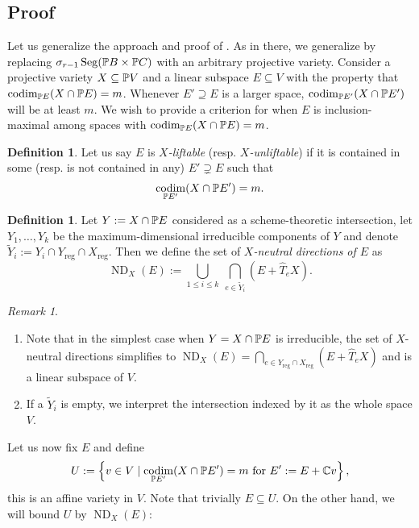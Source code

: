 \documentclass[a4paper,10pt]{article}
\def\reg{\text{reg}}
\def\set#1{\left\{#1\right\}}
\DeclareMathOperator{\codim}{codim}
\DeclareMathOperator{\ND}{ND}
\DeclareMathOperator{\Seg}{Seg}
\theoremstyle{definition}
\newtheorem{definition}[theorem]{Definition}
\theoremstyle{remark}
\newtheorem*{remark}{Remark}
\begin{document}
\subsection{Proof}

Let us generalize the approach and proof of \cite[Section 3]{draisma}. As in there, we generalize by replacing $\sigma_{r-1} \Seg(\pe B\times\pe C)$ with an arbitrary projective variety. Consider a projective variety $X\subseteq \pe V$ and a linear subspace $E\subseteq V$ with the property that $\codim_{\pe E}(X \cap \pe E) = m$. Whenever $E'\supseteq E$ is a larger space, $\codim_{\pe E'}(X\cap \pe E')$ will be at least $m$. We wish to provide a criterion for when $E$ is inclusion-maximal among spaces with $\codim_{\pe E}(X\cap \pe E)=m$.

\begin{definition}
    Let us say $E$ is \emph{$X$-liftable} (resp. \emph{$X$-unliftable}) if it is contained in some (resp. is not contained in any) $E'\supsetneq E$ such that
    \[
        \codim_{\pe E'} (X\cap \pe E') = m.
    \]
\end{definition}

\begin{definition}
    \label{def:NDX}
    Let $Y:=X\cap\pe E$ considered as a scheme-theoretic intersection, let $Y_1,\dots,Y_k$ be the maximum-dimensional irreducible components of $Y$ and denote $\tilde Y_i := Y_i\cap Y_\reg\cap X_\reg$.
    Then we define the set of \emph{$X$-neutral directions of $E$} as
    \[
        \ND_X(E) := \bigcup_{1\leq i\leq k}\ \bigcap_{e\in \tilde Y_i}(E+\hat T_{e}X).
    \]
\end{definition}
\begin{remark}
    \begin{enumerate}
    \item Note that in the simplest case when $Y=X\cap \pe E$ is irreducible, the set of $X$-neutral directions simplifies to
    $\ND_X(E) = \bigcap_{e\in Y_\reg\cap X_\reg} (E+\hat T_e X)$ and is a linear subspace of $V$.
    \item If a $\tilde Y_i$ is empty, we interpret the intersection indexed by it as the whole space $V$.
    \end{enumerate}
\end{remark}


Let us now fix $E$ and define
\[
    U := \set{v\in V\mid \text{$\codim_{\pe E'}(X\cap \pe E')=m$ for $E':= E+\ce v$}},
\]
this is an affine variety in $V$. Note that trivially $E\subseteq U$. On the other hand, we will bound $U$ by $\ND_X(E)$:
\end{document}
